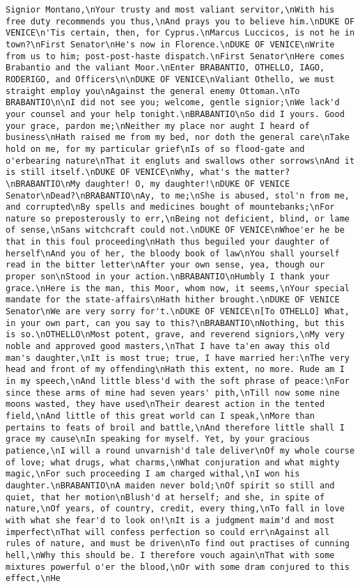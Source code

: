\begin{verbatim}
Signior Montano,\nYour trusty and most valiant servitor,\nWith his free duty recommends you thus,\nAnd prays you to believe him.\nDUKE OF VENICE\n'Tis certain, then, for Cyprus.\nMarcus Luccicos, is not he in town?\nFirst Senator\nHe's now in Florence.\nDUKE OF VENICE\nWrite from us to him; post-post-haste dispatch.\nFirst Senator\nHere comes Brabantio and the valiant Moor.\nEnter BRABANTIO, OTHELLO, IAGO, RODERIGO, and Officers\n\nDUKE OF VENICE\nValiant Othello, we must straight employ you\nAgainst the general enemy Ottoman.\nTo BRABANTIO\n\nI did not see you; welcome, gentle signior;\nWe lack'd your counsel and your help tonight.\nBRABANTIO\nSo did I yours. Good your grace, pardon me;\nNeither my place nor aught I heard of business\nHath raised me from my bed, nor doth the general care\nTake hold on me, for my particular grief\nIs of so flood-gate and o'erbearing nature\nThat it engluts and swallows other sorrows\nAnd it is still itself.\nDUKE OF VENICE\nWhy, what's the matter?\nBRABANTIO\nMy daughter! O, my daughter!\nDUKE OF VENICE Senator\nDead?\nBRABANTIO\nAy, to me;\nShe is abused, stol'n from me, and corrupted\nBy spells and medicines bought of mountebanks;\nFor nature so preposterously to err,\nBeing not deficient, blind, or lame of sense,\nSans witchcraft could not.\nDUKE OF VENICE\nWhoe'er he be that in this foul proceeding\nHath thus beguiled your daughter of herself\nAnd you of her, the bloody book of law\nYou shall yourself read in the bitter letter\nAfter your own sense, yea, though our proper son\nStood in your action.\nBRABANTIO\nHumbly I thank your grace.\nHere is the man, this Moor, whom now, it seems,\nYour special mandate for the state-affairs\nHath hither brought.\nDUKE OF VENICE Senator\nWe are very sorry for't.\nDUKE OF VENICE\n[To OTHELLO] What, in your own part, can you say to this?\nBRABANTIO\nNothing, but this is so.\nOTHELLO\nMost potent, grave, and reverend signiors,\nMy very noble and approved good masters,\nThat I have ta'en away this old man's daughter,\nIt is most true; true, I have married her:\nThe very head and front of my offending\nHath this extent, no more. Rude am I in my speech,\nAnd little bless'd with the soft phrase of peace:\nFor since these arms of mine had seven years' pith,\nTill now some nine moons wasted, they have used\nTheir dearest action in the tented field,\nAnd little of this great world can I speak,\nMore than pertains to feats of broil and battle,\nAnd therefore little shall I grace my cause\nIn speaking for myself. Yet, by your gracious patience,\nI will a round unvarnish'd tale deliver\nOf my whole course of love; what drugs, what charms,\nWhat conjuration and what mighty magic,\nFor such proceeding I am charged withal,\nI won his daughter.\nBRABANTIO\nA maiden never bold;\nOf spirit so still and quiet, that her motion\nBlush'd at herself; and she, in spite of nature,\nOf years, of country, credit, every thing,\nTo fall in love with what she fear'd to look on!\nIt is a judgment maim'd and most imperfect\nThat will confess perfection so could err\nAgainst all rules of nature, and must be driven\nTo find out practises of cunning hell,\nWhy this should be. I therefore vouch again\nThat with some mixtures powerful o'er the blood,\nOr with some dram conjured to this effect,\nHe 
\end{verbatim}
